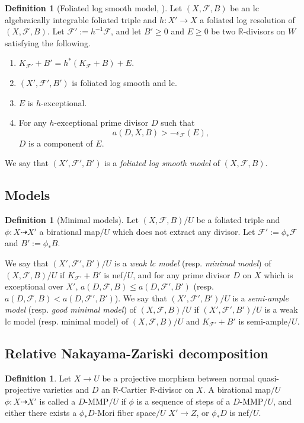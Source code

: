 \documentclass[11pt]{amsart}
\numberwithin{equation}{section}
\newcommand{\Rr}{\mathbb{R}}
\newcommand{\Ff}{\mathcal{F}}
\theoremstyle{definition}
\newtheorem{defn}[thm]{Definition}
\theoremstyle{definition}
\theoremstyle{definition}
\begin{document}
\begin{defn}[Foliated log smooth model,{ \cite[Definition 4.10]{LMX24b}}]\label{defn: log smooth models}
Let $(X,\Ff,B)$ be an lc algebraically integrable foliated triple and $h: X'\rightarrow X$ a foliated log resolution of $(X,\Ff,B)$. Let $\Ff':=h^{-1}\Ff$, and let $B'\geq 0$ and $E\geq 0$ be two $\Rr$-divisors on $W$ satisfying the following.
\begin{enumerate}
    \item $K_{\Ff'}+B'=h^*(K_\Ff+B)+E$.
    \item $(X',\Ff',B')$ is foliated log smooth and lc.
    \item $E$ is $h$-exceptional.
    \item For any $h$-exceptional prime divisor $D$ such that $$a(D,X,B)>-\epsilon_{\Ff}(E),$$ $D$ is a component of $E$.
\end{enumerate}
We say that $(X',\Ff',B')$ is a \emph{foliated log smooth model} of $(X,\Ff,B)$. 
\end{defn}

\subsection{Models}

\begin{defn}[Minimal models]\label{defn: minimal model}
Let $(X,\Ff,B)/U$ be a foliated triple and $\phi: X\dashrightarrow X'$ a birational map$/U$ which does not extract any divisor. Let $\Ff':=\phi_*\Ff$ and $B':=\phi_*B$. 

We say that $(X',\Ff',B')/U$ is a \emph{weak lc model} (resp. \emph{minimal model}) of $(X,\Ff,B)/U$ if $K_{\Ff'}+B'$ is nef$/U$, and for any prime divisor $D$ on $X$ which is exceptional over $X'$, $a(D,\Ff,B)\leq a(D,\Ff',B')$ (resp. $a(D,\Ff,B)<a(D,\Ff',B')$). We say that $(X',\Ff',B')/U$ is a \emph{semi-ample model} (resp. \emph{good minimal model}) of $(X,\Ff,B)/U$ if $(X',\Ff',B')/U$ is a weak lc model (resp. minimal model) of $(X,\Ff,B)/U$ and $K_{\Ff'}+B'$ is semi-ample$/U$.
\end{defn}




\subsection{Relative Nakayama-Zariski decomposition}


\begin{defn}
    Let $X\rightarrow U$ be a projective morphism between normal quasi-projective varieties and $D$ an $\Rr$-Cartier $\Rr$-divisor on $X$. A birational map$/U$ $\phi: X\dashrightarrow X'$ is called a $D$-MMP$/U$ if $\phi$ is a sequence of steps of a $D$-MMP$/U$, and either there exists a $\phi_*D$-Mori fiber space$/U$ $X'\rightarrow Z$, or $\phi_*D$ is nef$/U$.
\end{defn}
\end{document}
